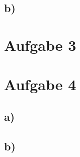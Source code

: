 \documentclass[11pt,a4paper,DIV=10,]{scrartcl}
\begin{document}
\subsection*{b)}

\section*{Aufgabe 3}

\section*{Aufgabe 4}
\subsection*{a)}
\subsection*{b)}




\end{document}
